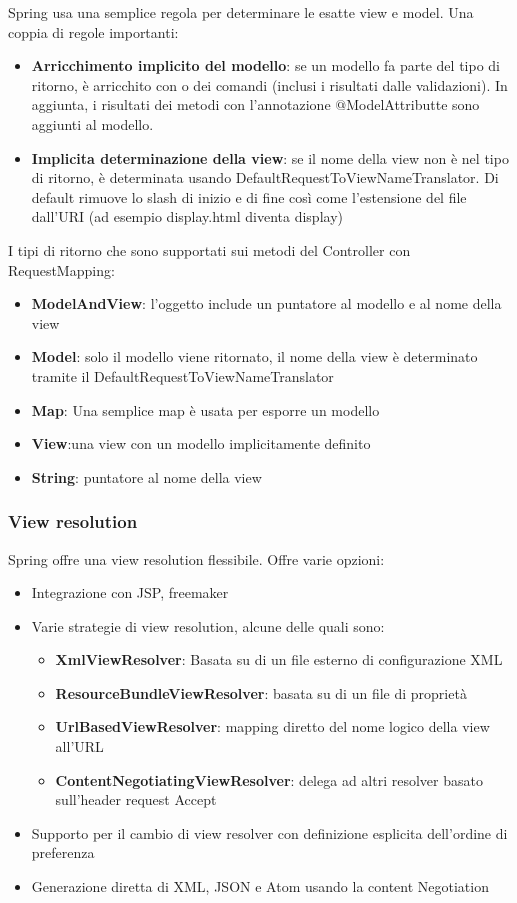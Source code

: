 \documentclass[11pt,a4paper]{book}
\begin{document}
Spring usa una semplice regola per determinare le esatte view e model. Una coppia di regole importanti:
\begin{itemize}
	\item \textbf{Arricchimento implicito del modello}: se un modello fa parte del tipo di ritorno, è arricchito con o dei comandi (inclusi i risultati dalle validazioni). In aggiunta, i risultati dei metodi con l'annotazione $@$ModelAttributte sono aggiunti al modello.
	\item \textbf{Implicita determinazione della view}: se il nome della view non è nel tipo di ritorno, è determinata usando DefaultRequestToViewNameTranslator. Di default rimuove lo slash di inizio e di fine così come l'estensione del file dall'URI (ad esempio display.html diventa display)
\end{itemize}
I tipi di ritorno che sono supportati sui metodi del Controller con RequestMapping:
\begin{itemize}
	\item \textbf{ModelAndView}: l'oggetto include un puntatore al modello e al nome della view
	\item \textbf{Model}: solo il modello viene ritornato, il nome della view è determinato tramite il  DefaultRequestToViewNameTranslator
	\item \textbf{Map}: Una semplice map è usata per esporre un modello
	\item \textbf{View}:una view con un modello implicitamente definito
	\item \textbf{String}: puntatore al nome della view
\end{itemize}

\subsubsection{View resolution}
Spring offre una view resolution flessibile. Offre varie opzioni:
\begin{itemize}
	\item Integrazione con JSP, freemaker
	\item Varie strategie di view resolution, alcune delle quali sono:
	\begin{itemize}
		\item \textbf{XmlViewResolver}: Basata su di un file esterno di configurazione XML
		\item \textbf{ResourceBundleViewResolver}: basata su di un file di proprietà
		\item \textbf{UrlBasedViewResolver}: mapping diretto del nome logico della view all'URL
		\item \textbf{ContentNegotiatingViewResolver}: delega ad altri resolver basato sull'header request Accept
	\end{itemize}
	\item Supporto per il cambio di view resolver con definizione esplicita dell'ordine di preferenza
	\item Generazione diretta di XML, JSON e Atom usando la content Negotiation
\end{itemize}
\end{document}
